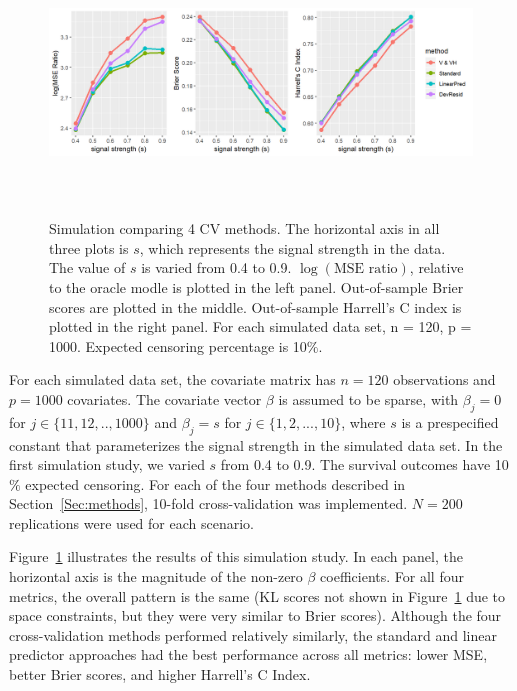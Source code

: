 \begin{figure}[ht]
  \centering
  \includegraphics[height= 7cm ]{./manuscript_figure/figure_2_new.png}
  \caption{\label{Fig:mse-brier-c} Simulation comparing 4 CV methods. The horizontal axis in all three plots is $s$, which represents the signal strength in the data. The value of $s$ is varied from 0.4 to 0.9.  $\log(\text{MSE ratio})$, relative to the oracle modle is plotted in the left panel. Out-of-sample Brier scores are plotted in the middle. Out-of-sample Harrell's C index is plotted in the right panel. For each simulated data set, n = 120, p = 1000. Expected censoring percentage is 10$\%$. 
}
\end{figure}	

 For each simulated data set, the covariate matrix has $n = 120$ observations and $p = 1000$ covariates. The covariate vector $\beta$ is assumed to be sparse, with $\beta_j = 0$ for $j \in \{11,12,..,1000\}$ and $\beta_j = s$ for $j \in \{1,2, ..., 10 \}$, where $s$ is a prespecified constant that parameterizes the signal strength in the simulated data set. In the first simulation study, we varied $s$ from 0.4 to 0.9. The survival outcomes have 10$\%$ expected censoring. For each of the four methods described in Section~\ref{Sec:methods}, 10-fold cross-validation was implemented. $N = 200$ replications were used for each scenario.

\par Figure~\ref{Fig:mse-brier-c} illustrates the results of this simulation study. In each panel, the horizontal axis is the magnitude of the non-zero $\beta$ coefficients.  For all four metrics, the overall pattern is the same (KL scores not shown in Figure~\ref{Fig:mse-brier-c} due to space constraints, but they were very similar to Brier scores).  Although the four cross-validation methods performed relatively similarly, the standard and linear predictor approaches had the best performance across all metrics: lower MSE, better Brier scores, and higher Harrell's C Index.
 
